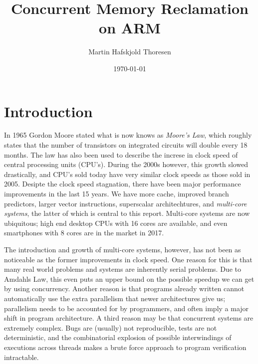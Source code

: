 \documentclass[b5paper]{report}
\begin{document}
\title{Concurrent Memory Reclamation on ARM}
\author{Martin Hafskjold Thoresen}
\date{\today}
\maketitle



\begin{abstract}
  \todo{}
\end{abstract}

\tableofcontents

\chapter{Introduction}

In 1965 Gordon Moore stated what is now knows as \emph{Moore's Law}, which
roughly states that the number of transistors on integrated circuits will double
every 18 months. The law has also been used to describe the increse in clock
speed of central processing units (CPU's). During the 2000s however, this growth
slowed drastically, and CPU's sold today have very similar clock speeds as those
sold in 2005. Desipte the clock speed stagnation, there have been major
performance improvements in the last 15 years. We have more cache, improved
branch predictors, larger vector instructions, superscalar architechtures, and
\emph{multi-core systems}, the latter of which is central to this report.
Multi-core systems are now ubiquitous; high end desktop CPUs with 16 cores are
available, and even smartphones with 8 cores are in the market in 2017.

The introduction and growth of multi-core systems, however, has not been as
noticeable as the former improvements in clock speed. One reason for this is
that many real world problems and systems are inherently serial problems. Due to
Amdahls Law, this even puts an upper bound on the possible speedup we can get by
using concurrency.  Another reason is that programs already written cannot
automatically use the extra parallelism that newer architectures give us;
parallelism needs to be accounted for by programmers, and often imply a major
shift in program architecture. A third reason may be that concurrent systems are
extremely complex. Bugs are (usually) not reproducible, tests are not
deterministic, and the combinatorial explosion of possible interwindings of
executions across threads makes a brute force approach to program verification
intractable.
\end{document}

